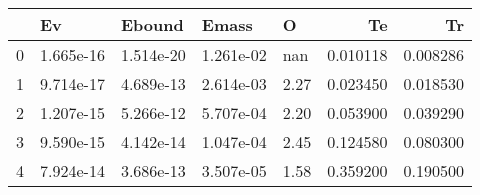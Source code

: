 \begin{tabular}{lllllrr}
\toprule
{} &         Ev &     Ebound &      Emass &     O &        Te &        Tr \\
\midrule
0 &  1.665e-16 &  1.514e-20 &  1.261e-02 &   nan &  0.010118 &  0.008286 \\
1 &  9.714e-17 &  4.689e-13 &  2.614e-03 &  2.27 &  0.023450 &  0.018530 \\
2 &  1.207e-15 &  5.266e-12 &  5.707e-04 &  2.20 &  0.053900 &  0.039290 \\
3 &  9.590e-15 &  4.142e-14 &  1.047e-04 &  2.45 &  0.124580 &  0.080300 \\
4 &  7.924e-14 &  3.686e-13 &  3.507e-05 &  1.58 &  0.359200 &  0.190500 \\
\bottomrule
\end{tabular}
